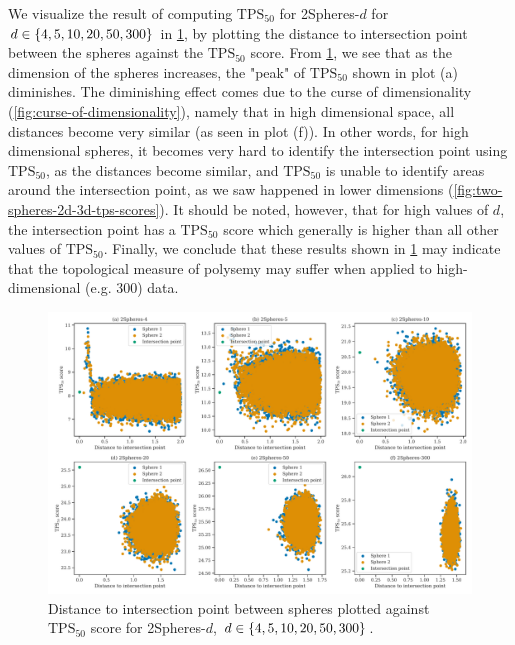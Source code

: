 We visualize the result of computing $\text{TPS}_{50}$ for 2Spheres-$d$ for $d \in \left\{4, 5, 10, 20, 50, 300\right\}$ in \cref{fig:two-spheres-distance-to-int-point-vs-tps-scores}, by plotting the distance to intersection point between the spheres against the $\text{TPS}_{50}$ score. From \cref{fig:two-spheres-distance-to-int-point-vs-tps-scores}, we see that as the dimension of the spheres increases, the "peak" of $\text{TPS}_{50}$ shown in plot (a) diminishes. The diminishing effect comes due to the curse of dimensionality (\cref{fig:curse-of-dimensionality}), namely that in high dimensional space, all distances become very similar (as seen in plot (f)). In other words, for high dimensional spheres, it becomes very hard to identify the intersection point using $\text{TPS}_{50}$, as the distances become similar, and $\text{TPS}_{50}$ is unable to identify areas around the intersection point, as we saw happened in lower dimensions (\cref{fig:two-spheres-2d-3d-tps-scores}). It should be noted, however, that for high values of $d$, the intersection point has a $\text{TPS}_{50}$ score which generally is higher than all other values of $\text{TPS}_{50}$. Finally, we conclude that these results shown in \cref{fig:two-spheres-distance-to-int-point-vs-tps-scores} may indicate that the topological measure of polysemy may suffer when applied to high-dimensional (e.g. 300) data.
\begin{figure}[H]
    \centering
    \includegraphics[width=\textwidth]{thesis/figures/two-spheres-distance-to-int-point-vs-tps-scores.pdf}
    \caption{Distance to intersection point between spheres plotted against $\text{TPS}_{50}$ score for 2Spheres-$d$, $d \in \left\{4, 5, 10, 20, 50, 300\right\}$.}
    \label{fig:two-spheres-distance-to-int-point-vs-tps-scores}
\end{figure}

